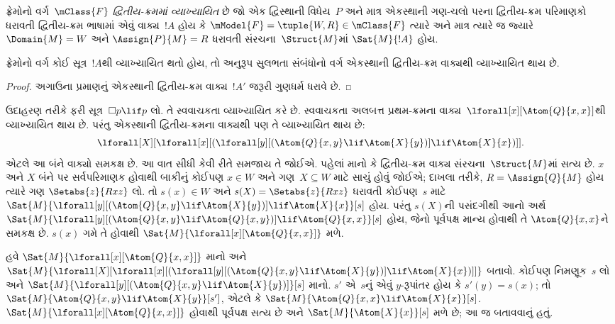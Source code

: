 \begin{defn}
  ફ્રેમોનો વર્ગ~$\mClass{F}$ \emph{દ્વિતીય-ક્રમમાં
  વ્યાખ્યાયિત} છે જો એક દ્વિસ્થાની વિધેય~$P$
  અને માત્ર એકસ્થાની ગણ-ચલો પરના દ્વિતીય-ક્રમ પરિમાણકો
  ધરાવતી દ્વિતીય-ક્રમ ભાષામાં એવું વાક્ય~$!A$
  હોય કે $\mModel{F} = \tuple{W, R} \in \mClass{F}$
  ત્યારે અને માત્ર ત્યારે જ જ્યારે $\Domain{M} = W$
  અને $\Assign{P}{M} = R$ ધરાવતી
  સંરચના~$\Struct{M}$માં $\Sat{M}{!A}$ હોય.
\end{defn}

\begin{cor}
  ફ્રેમોનો વર્ગ કોઈ સૂત્ર~$!A$થી
  વ્યાખ્યાયિત થતો હોય, તો અનુરૂપ સુલભતા
  સંબંધોનો વર્ગ એકસ્થાની દ્વિતીય-ક્રમ વાક્યથી
  વ્યાખ્યાયિત થાય છે.
\end{cor}

\begin{proof}
  અગાઉના પ્રમાણનું એકસ્થાની દ્વિતીય-ક્રમ
  વાક્ય~$!A'$ જરૂરી ગુણધર્મ ધરાવે છે.
\end{proof}

ઉદાહરણ તરીકે ફરી સૂત્ર~$\Box p \lif p$ લો.
તે સ્વવાચકતા વ્યાખ્યાયિત કરે છે. સ્વવાચકતા
અલબત્ત પ્રથમ-ક્રમના વાક્ય~$\lforall[x][\Atom{Q}{x,x}]$થી
વ્યાખ્યાયિત થાય છે. પરંતુ એકસ્થાની દ્વિતીય-ક્રમના
વાક્યથી પણ તે વ્યાખ્યાયિત થાય છે:
\[
\lforall[X][\lforall[x][(\lforall[y][(\Atom{Q}{x,y} \lif \Atom{X}{y})]
    \lif \Atom{X}{x})]].
\]
એટલે આ બંને વાક્યો સમકક્ષ છે. આ વાત સીધી
કેવી રીતે સમજાય તે જોઈએ. પહેલાં માનો કે
દ્વિતીય-ક્રમ વાક્ય સંરચના~$\Struct{M}$માં
સત્ય છે. $x$ અને $X$ બંને પર સર્વપરિમાણક
હોવાથી બાકીનું કોઈપણ $x \in W$ અને
ગણ~$X \subseteq W$ માટે સાચું હોવું જોઈએ;
દાખલા તરીકે, $R =
\Assign{Q}{M}$ હોય ત્યારે ગણ
$\Setabs{z}{Rxz}$ લો. તો $s(x) \in W$ અને
$s(X) =
\Setabs{z}{Rxz}$ ધરાવતી કોઈપણ~$s$ માટે
$\Sat{M}{\lforall[y][(\Atom{Q}{x,y} \lif
    \Atom{X}{y})] \lif \Atom{X}{x}}[s]$ હોય.
પરંતુ $s(X)$ની પસંદગીથી આનો અર્થ
$\Sat{M}{\lforall[y][(\Atom{Q}{x,y} \lif
    \Atom{Q}{x,y})] \lif \Atom{Q}{x,x}}[s]$ હોય,
જેનો પૂર્વપક્ષ માન્ય હોવાથી તે
$\Atom{Q}{x,x}$ને સમકક્ષ છે. $s(x)$ ગમે તે
હોવાથી $\Sat{M}{\lforall[x][\Atom{Q}{x,x}]}$ મળે.

હવે $\Sat{M}{\lforall[x][\Atom{Q}{x,x}]}$ માનો
અને $\Sat{M}{\lforall[X][\lforall[x][(\lforall[y][(\Atom{Q}{x,y} \lif
        \Atom{X}{y})] \lif \Atom{X}{x})]]}$ બતાવો.
કોઈપણ નિમણૂક~$s$ લો અને
$\Sat{M}{\lforall[y][(\Atom{Q}{x,y} \lif
    \Atom{X}{y})]}[s]$ માનો. $s'$ એ~$s$નું એવું
$y$-રૂપાંતર હોય કે $s'(y)
= s(x)$; તો $\Sat{M}{\Atom{Q}{x,y} \lif \Atom{X}{y}}[s']$,
એટલે કે $\Sat{M}{\Atom{Q}{x,x} \lif \Atom{X}{x}}[s]$.
$\Sat{M}{\lforall[x][\Atom{Q}{x,x}]}$ હોવાથી
પૂર્વપક્ષ સત્ય છે અને $\Sat{M}{\Atom{X}{x}}[s]$
મળે છે; આ જ બતાવવાનું હતું.

